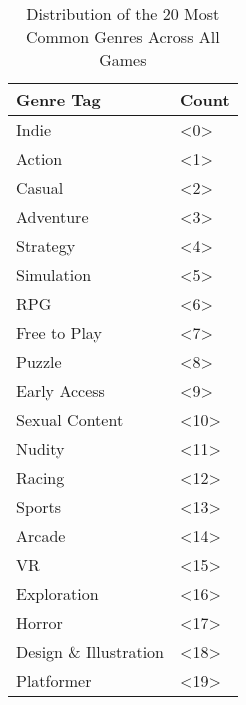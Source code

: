 \begin{table}[h]
    \centering
    \begin{tabular}{l|l}
    Genre Tag & Count\\\hline
        Indie                   & <0>\\
        Action                  & <1>\\
        Casual                  & <2>\\
        Adventure               & <3>\\
        Strategy                & <4>\\
        Simulation              & <5>\\
        RPG                     & <6>\\
        Free to Play            & <7>\\
        Puzzle                  & <8>\\
        Early Access            & <9>\\
        Sexual Content          & <10>\\
        Nudity                  & <11>\\
        Racing                  & <12>\\
        Sports                  & <13>\\
        Arcade                  & <14>\\
        VR                      & <15>\\
        Exploration             & <16>\\
        Horror                  & <17>\\
        Design \& Illustration  & <18>\\
        Platformer              & <19>
    \end{tabular}
    \caption{Distribution of the 20 Most Common Genres Across All Games}
    \label{tab:genre_metrics}
\end{table}